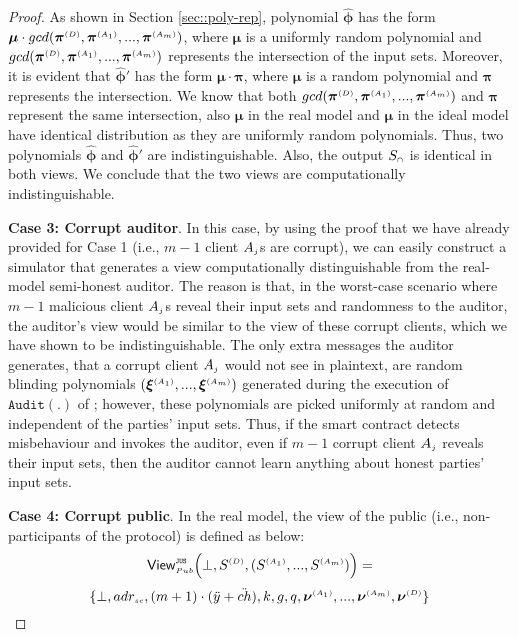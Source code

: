 \begin{proof}
 
 As shown in Section \ref{sec::poly-rep},  polynomial $\bm{\hat\phi}$ has the form $\bm\mu\cdot gcd( \bm\pi^{ \scriptscriptstyle {  {(D)}} },\bm\pi^{\scriptscriptstyle (A_1)}, ..., \bm\pi^{\scriptscriptstyle (A_m)})$, where $\bm\mu$ is a uniformly random polynomial and $gcd( \bm\pi^{ \scriptscriptstyle {  {(D)}} },\bm\pi^{\scriptscriptstyle (A_1)}, ..., \bm\pi^{\scriptscriptstyle (A_m)})$ represents the intersection of the input sets. Moreover, it is evident that $\bm{\hat\phi}'$ has the form $ {\bm\mu} \cdot  {\bm\pi}$, where $ {\bm\mu} $ is a random polynomial and $ {\bm\pi}$ represents the intersection. We know that both $gcd( \bm\pi^{ \scriptscriptstyle {  {(D)}} },\bm\pi^{\scriptscriptstyle (A_1)}, ..., \bm\pi^{\scriptscriptstyle (A_m)})$ and $ {\bm\pi}$  represent the same intersection, also  ${\bm\mu} $ in the real model and $ {\bm\mu} $ in the ideal model have identical distribution as they are uniformly random polynomials. Thus, two polynomials $\bm{\hat\phi}$ and $\bm{\hat\phi}'$ are indistinguishable. Also, the output $S_{\scriptscriptstyle \cap}$ is identical in both views. We conclude that the two views are computationally indistinguishable.
 

\noindent\textbf{Case 3: Corrupt auditor}.  In this case, by using the proof that we have already provided for Case 1 (i.e.,  $m-1$ client $A_{\scriptscriptstyle j}$s are corrupt), we can easily construct a simulator that generates a view computationally distinguishable from the real-model semi-honest auditor. 
 The reason is that, in the worst-case scenario where $m-1$ malicious client $A_{\scriptscriptstyle j}$s reveal their input sets and randomness to the auditor, the auditor's view would be similar to the view of these corrupt clients, which we have shown to be indistinguishable. The only extra messages the auditor generates, that a corrupt client $A_{\scriptscriptstyle j}$ would not see in plaintext, are random blinding polynomials $(\bm\xi^{\scriptscriptstyle (A_1)},..., \bm\xi^{\scriptscriptstyle (A_m)})$ generated during the execution of $\mathtt{Audit}(.)$ of \zspaa; however, these polynomials are picked uniformly at random and independent of the parties' input sets. Thus, if the smart contract detects misbehaviour and invokes the auditor, even if $m-1$ corrupt client $A_{\scriptscriptstyle j}$ reveals their input sets, then the auditor cannot learn anything about honest parties' input sets.    
 
 

\noindent\textbf{Case 4: Corrupt public}. In the real model, the view of the public (i.e., non-participants of the protocol) is defined as below: 
 $$ \mathsf{View}_{\scriptscriptstyle Pub}^{\scriptscriptstyle \mathtt{JUS}} \Big(\bot, S^{\scriptscriptstyle (D)},(S^{\scriptscriptstyle (A_1)},..., S^{\scriptscriptstyle (A_m)})\Big)=$$ $$ \{\bot, adr_{\scriptscriptstyle sc}, (m+1)\cdot(\ddot{y}+\ddot{ch}), k, g, q, \bm\nu^{\scriptscriptstyle (A_1)},..., \bm\nu^{\scriptscriptstyle (A_m)}, \bm\nu^{\scriptscriptstyle (D)}\}$$
 

\end{proof}
